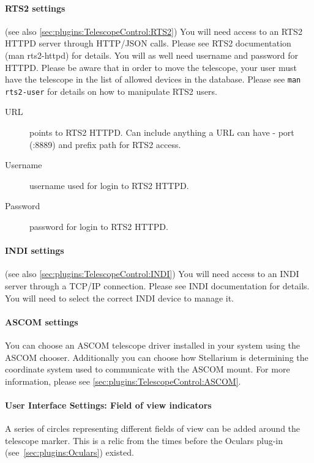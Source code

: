 \paragraph{RTS2 settings} (see also \ref{sec:plugins:TelescopeControl:RTS2})
You will need access to an RTS2 HTTPD server through HTTP/JSON calls.
Please see RTS2 documentation (man rts2-httpd) for details. You will as well need username
and password for HTTPD. Please be aware that in order to move the telescope,
your user must have the telescope in the list of allowed devices in the database. Please see \texttt{man
rts2-user} for details on how to manipulate RTS2 users.

\begin{description}
\item[URL] points to RTS2 HTTPD. Can include anything a URL can have - port
  (:8889) and prefix path for RTS2 access.
\item[Username] username used for login to RTS2 HTTPD.
\item[Password] password for login to RTS2 HTTPD.
\end{description}

\paragraph{INDI settings} (see also \ref{sec:plugins:TelescopeControl:INDI})
You will need access to an INDI server through a TCP/IP connection.
Please see INDI documentation for details. You will need to select the correct INDI device to manage it.

\paragraph{ASCOM settings}
You can choose an ASCOM telescope driver installed in your system
using the ASCOM chooser. Additionally you can
choose how Stellarium is determining the coordinate system used to
communicate with the ASCOM mount. For more information, please see
\ref{sec:plugins:TelescopeControl:ASCOM}.

\paragraph{User Interface Settings: Field of view indicators}

A series of circles representing different fields of view can be added
around the telescope marker. This is a relic from the times before the
Oculars plug-in (see~\ref{sec:plugins:Oculars}) existed.

